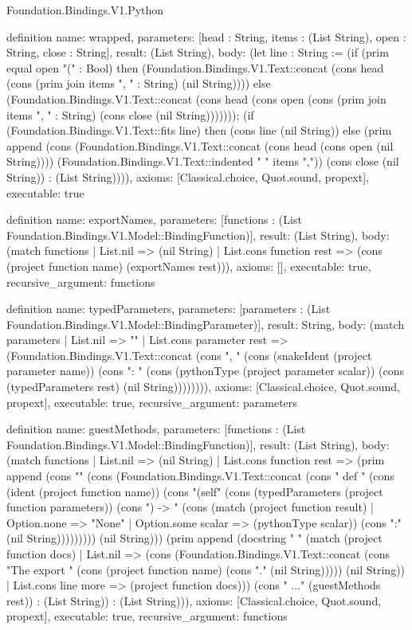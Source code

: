 \begin{lexlean}{Foundation.Bindings.V1.Python}
\begin{semanticmodule}
definition{
  name: wrapped,
  parameters: [head : String, items : (List String), open : String, close : String],
  result: (List String),
  body: (let line : String := (if (prim equal open "(" : Bool) then (Foundation.Bindings.V1.Text::concat (cons head (cons (prim join items ", " : String) (nil String)))) else (Foundation.Bindings.V1.Text::concat (cons head (cons open (cons (prim join items ", " : String) (cons close (nil String))))))); (if (Foundation.Bindings.V1.Text::fits line) then (cons line (nil String)) else (prim append (cons (Foundation.Bindings.V1.Text::concat (cons head (cons open (nil String)))) (Foundation.Bindings.V1.Text::indented "    " items ",")) (cons close (nil String)) : (List String)))),
  axioms: [Classical.choice, Quot.sound, propext],
  executable: true
}

definition{
  name: exportNames,
  parameters: [functions : (List Foundation.Bindings.V1.Model::BindingFunction)],
  result: (List String),
  body: (match functions
    | List.nil => (nil String)
    | List.cons function rest => (cons (project function name) (exportNames rest))),
  axioms: [],
  executable: true,
  recursive_argument: functions
}

definition{
  name: typedParameters,
  parameters: [parameters : (List Foundation.Bindings.V1.Model::BindingParameter)],
  result: String,
  body: (match parameters
    | List.nil => ""
    | List.cons parameter rest => (Foundation.Bindings.V1.Text::concat (cons ", " (cons (snakeIdent (project parameter name)) (cons ": " (cons (pythonType (project parameter scalar)) (cons (typedParameters rest) (nil String)))))))),
  axioms: [Classical.choice, Quot.sound, propext],
  executable: true,
  recursive_argument: parameters
}

definition{
  name: guestMethods,
  parameters: [functions : (List Foundation.Bindings.V1.Model::BindingFunction)],
  result: (List String),
  body: (match functions
    | List.nil => (nil String)
    | List.cons function rest => (prim append (cons "" (cons (Foundation.Bindings.V1.Text::concat (cons "    def " (cons (ident (project function name)) (cons "(self" (cons (typedParameters (project function parameters)) (cons ") -> " (cons (match (project function result)
      | Option.none => "None"
      | Option.some scalar => (pythonType scalar)) (cons ":" (nil String))))))))) (nil String))) (prim append (docstring "        " (match (project function docs)
      | List.nil => (cons (Foundation.Bindings.V1.Text::concat (cons "The export " (cons (project function name) (cons "." (nil String))))) (nil String))
      | List.cons line more => (project function docs))) (cons "        ..." (guestMethods rest)) : (List String)) : (List String))),
  axioms: [Classical.choice, Quot.sound, propext],
  executable: true,
  recursive_argument: functions
}


\end{semanticmodule}
\end{lexlean}
